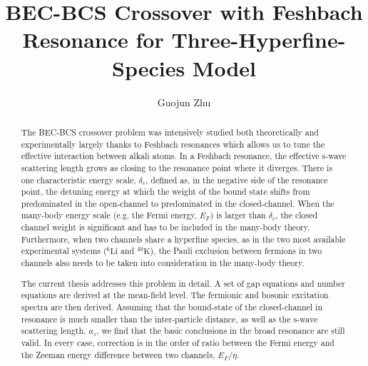 \documentclass[edeposit,fullpage,prequest,10pt]{uiucthesis2009}
\begin{document}
\title{BEC-BCS Crossover with Feshbach Resonance for Three-Hyperfine-Species Model}
\author{Guojun Zhu}
\phdthesis
{}
\maketitle

\frontmatter

%
\begin{abstract}
The BEC-BCS crossover problem was intensively studied both theoretically and experimentally largely thanks to  Feshbach resonances which allows us to tune the effective interaction between alkali atoms.  In a Feshbach resonance, the effective s-wave scattering length grows as closing to the resonance point where it diverges.  There is one characteristic energy scale, $\delta_c$, defined as, in the negative side of the resonance point, the detuning energy at which the weight of the bound state shifts from predominated in the open-channel to predominated in the closed-channel.  When the many-body energy scale (e.g. the Fermi energy, $E_{F}$) is larger than $\delta_c$, the closed channel weight is significant and has to be included in the many-body theory.  Furthermore, when two channels share a hyperfine species, as in the two most available experimental systems (${}^6\text{Li}$ and ${}^{40}\text{K}$), the Pauli exclusion between fermions in two channels also needs to be taken into consideration in the many-body theory.  

The current  thesis addresses this problem in detail. A set of gap equations and number equations  are derived at the mean-field level.  The fermionic and bosonic excitation spectra are then derived. Assuming that the bound-state of the closed-channel in resonance is much smaller than the inter-particle distance, as well as the s-wave scattering length, $a_s$, we find that  the basic conclusions in the broad resonance are still valid. In every case, correction is  in the  order of ratio between the Fermi energy and the Zeeman energy difference between two channels, $E_F/\eta$.  
\end{abstract}
\end{document}
